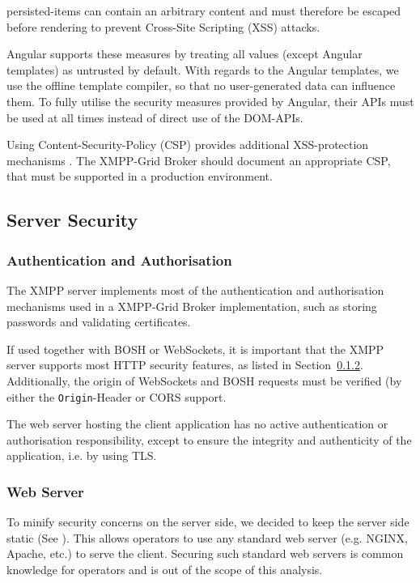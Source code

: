 \Glspl{persisted-item} can contain an arbitrary content and must therefore be escaped before rendering to prevent Cross-Site Scripting (XSS) attacks.

Angular supports these measures by treating all values (except Angular templates) as untrusted by default.
With regards to the Angular templates, we use the offline template compiler, so that no user-generated data can influence them. To fully utilise the security measures provided by Angular, their APIs must be used at all times instead of direct use of the DOM-APIs.~\cite{angular-security}

Using Content-Security-Policy (CSP) provides additional XSS-protection mechanisms \cite{w3c-csp}.
The XMPP-Grid Broker should document an appropriate CSP, that must be supported in a production environment.

\subsection{Server Security}

\subsubsection{Authentication and Authorisation}

The XMPP server implements most of the authentication and authorisation mechanisms used in a XMPP-Grid Broker implementation, such as storing passwords and validating certificates.

If used together with BOSH or WebSockets, it is important that the XMPP server supports most HTTP security features, as listed in Section~\ref{sec:web-server}. Additionally, the origin of WebSockets and BOSH requests must be verified (by either the \texttt{Origin}-Header or CORS support.~\cite{rfc6455}\cite{cross-origin-resource-sharing}

The web server hosting the client application has no active authentication or authorisation responsibility, except to ensure the integrity and authenticity of the application, i.e. by using TLS.

\subsubsection{Web Server}\label{sec:web-server}

To minify security concerns on the server side, we decided to keep the server side static (See ).
This allows operators to use any standard web server (e.g. NGINX, Apache, etc.) to serve the client.
Securing such standard web servers is common knowledge for operators and is out of the scope of this analysis.

